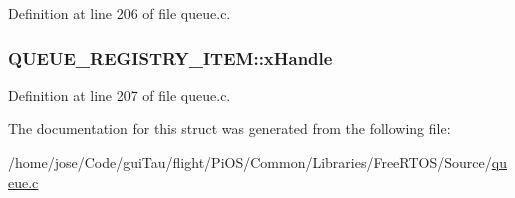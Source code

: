 Definition at line 206 of file queue.\-c.

\hypertarget{struct_q_u_e_u_e___r_e_g_i_s_t_r_y___i_t_e_m_a48364674fcd66dd86aa68ffa50186e48}{
\subsubsection[{x\-Handle}]{ Q\-U\-E\-U\-E\-\_\-\-R\-E\-G\-I\-S\-T\-R\-Y\-\_\-\-I\-T\-E\-M\-::x\-Handle}}\label{struct_q_u_e_u_e___r_e_g_i_s_t_r_y___i_t_e_m_a48364674fcd66dd86aa68ffa50186e48}


Definition at line 207 of file queue.\-c.



The documentation for this struct was generated from the following file\-:\begin{DoxyCompactItemize}
\item 
/home/jose/\-Code/gui\-Tau/flight/\-Pi\-O\-S/\-Common/\-Libraries/\-Free\-R\-T\-O\-S/\-Source/\hyperlink{_common_2_libraries_2_free_r_t_o_s_2_source_2queue_8c}{queue.\-c}\end{DoxyCompactItemize}
